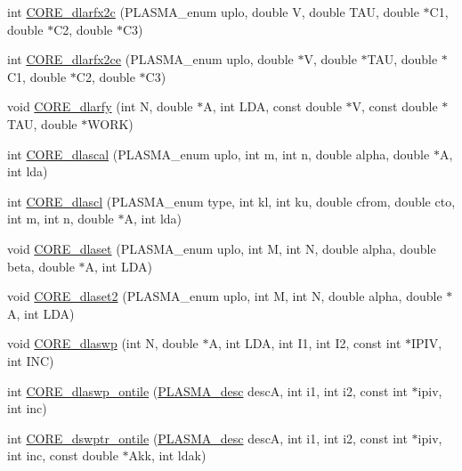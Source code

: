 \begin{DoxyCompactItemize}
int \hyperlink{group__CORE__double_ga49acb5eb786b9f9dedf219519700a4ee_ga49acb5eb786b9f9dedf219519700a4ee}{C\+O\+R\+E\+\_\+dlarfx2c} (P\+L\+A\+S\+M\+A\+\_\+enum uplo, double V, double T\+A\+U, double $\ast$C1, double $\ast$C2, double $\ast$C3)
\item 
int \hyperlink{group__CORE__double_ga202fe50b16b0e3d62660d8095892c60a_ga202fe50b16b0e3d62660d8095892c60a}{C\+O\+R\+E\+\_\+dlarfx2ce} (P\+L\+A\+S\+M\+A\+\_\+enum uplo, double $\ast$V, double $\ast$T\+A\+U, double $\ast$C1, double $\ast$C2, double $\ast$C3)
\item 
void \hyperlink{group__CORE__double_gae4b0750d5458f4e789c2c2e46f7803db_gae4b0750d5458f4e789c2c2e46f7803db}{C\+O\+R\+E\+\_\+dlarfy} (int N, double $\ast$A, int L\+D\+A, const double $\ast$V, const double $\ast$T\+A\+U, double $\ast$W\+O\+R\+K)
\item 
int \hyperlink{group__CORE__double_ga2aaae67cd886ae1519b6b275399224fb_ga2aaae67cd886ae1519b6b275399224fb}{C\+O\+R\+E\+\_\+dlascal} (P\+L\+A\+S\+M\+A\+\_\+enum uplo, int m, int n, double alpha, double $\ast$A, int lda)
\item 
int \hyperlink{group__CORE__double_ga36b17d504981a34d6d99186da82e2a28_ga36b17d504981a34d6d99186da82e2a28}{C\+O\+R\+E\+\_\+dlascl} (P\+L\+A\+S\+M\+A\+\_\+enum type, int kl, int ku, double cfrom, double cto, int m, int n, double $\ast$A, int lda)
\item 
void \hyperlink{group__CORE__double_ga1c669131b52830b6553434ea23afa985_ga1c669131b52830b6553434ea23afa985}{C\+O\+R\+E\+\_\+dlaset} (P\+L\+A\+S\+M\+A\+\_\+enum uplo, int M, int N, double alpha, double beta, double $\ast$A, int L\+D\+A)
\item 
void \hyperlink{group__CORE__double_ga4642e2b653e27425594106afd89c4859_ga4642e2b653e27425594106afd89c4859}{C\+O\+R\+E\+\_\+dlaset2} (P\+L\+A\+S\+M\+A\+\_\+enum uplo, int M, int N, double alpha, double $\ast$A, int L\+D\+A)
\item 
void \hyperlink{group__CORE__double_ga106b201ef777b959b2233bd7d4b40305_ga106b201ef777b959b2233bd7d4b40305}{C\+O\+R\+E\+\_\+dlaswp} (int N, double $\ast$A, int L\+D\+A, int I1, int I2, const int $\ast$I\+P\+I\+V, int I\+N\+C)
\item 
int \hyperlink{group__CORE__double_gadb50a1cf5c2191046cfa1055414bcc89_gadb50a1cf5c2191046cfa1055414bcc89}{C\+O\+R\+E\+\_\+dlaswp\+\_\+ontile} (\hyperlink{structplasma__desc__t}{P\+L\+A\+S\+M\+A\+\_\+desc} desc\+A, int i1, int i2, const int $\ast$ipiv, int inc)
\item 
int \hyperlink{group__CORE__double_gaead98c5d81d7747aef84af1883b4bac1_gaead98c5d81d7747aef84af1883b4bac1}{C\+O\+R\+E\+\_\+dswptr\+\_\+ontile} (\hyperlink{structplasma__desc__t}{P\+L\+A\+S\+M\+A\+\_\+desc} desc\+A, int i1, int i2, const int $\ast$ipiv, int inc, const double $\ast$Akk, int ldak)

\end{DoxyCompactItemize}
